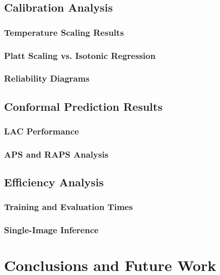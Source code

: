 \section{Calibration Analysis}\label{sec:calib-results}
\subsection{Temperature Scaling Results}
\subsection{Platt Scaling vs. Isotonic Regression}
\subsection{Reliability Diagrams}

\section{Conformal Prediction Results}\label{sec:conformal-results}
\subsection{LAC Performance}
\subsection{APS and RAPS Analysis}

\section{Efficiency Analysis}\label{sec:efficiency}
\subsection{Training and Evaluation Times}
\subsection{Single-Image Inference}



\chapter{Conclusions and Future Work}\label{chap:conclusions}

